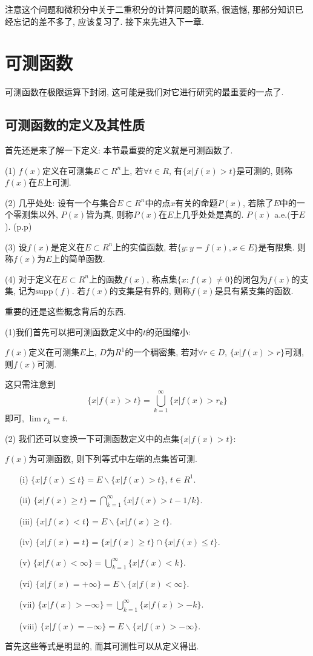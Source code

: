 \documentclass[12pt,a4paper,openany]{book}
\begin{document}
注意这个问题和微积分中关于二重积分的计算问题的联系, 很遗憾, 那部分知识已经忘记的差不多了, 应该复习了. 接下来先进入下一章.

\chapter{可测函数}
可测函数在极限运算下封闭, 这可能是我们对它进行研究的最重要的一点了.

\section{可测函数的定义及其性质}
首先还是来了解一下定义: 本节最重要的定义就是可测函数了.

(1) $f(x)$定义在可测集$E \subset R^n$上, 若$\forall t \in R$, 有$\{x | f(x) > t\}$是可测的, 则称$f(x)$在$E$上可测.

(2) 几乎处处: 设有一个与集合$E \subset R^n$中的点$x$有关的命题$P(x)$, 若除了$E$中的一个零测集以外, $P(x)$皆为真, 则称$P(x)$在$E$上几乎处处是真的. $P(x)$ a.e.(于$E$). (p.p)

(3) 设$f(x)$是定义在$E \subset R^n$上的实值函数, 若$\{y : y = f(x), x \in E\}$是有限集. 则称$f(x)$为$E$上的简单函数.

(4) 对于定义在$E \subset R^n$上的函数$f(x)$, 称点集$\{x:f(x) \neq 0\}$的闭包为$f(x)$的支集, 记为$\text{supp}(f)$. 若$f(x)$的支集是有界的, 则称$f(x)$是具有紧支集的函数.

重要的还是这些概念背后的东西.

(1)我们首先可以把可测函数定义中的$t$的范围缩小:

$f(x)$定义在可测集$E$上, $D$为$R^1$的一个稠密集, 若对$\forall r \in D$, $\{x | f(x) > r\}$可测, 则$f(x)$可测.

这只需注意到
\[
\{x | f(x) > t\} = \bigcup_{k=1}^{\infty}{\{ x | f(x) > r_k \}}
\]
即可, $\lim{r_k} = t$.

(2) 我们还可以变换一下可测函数定义中的点集$\{x | f(x) > t\}$:

$f(x)$为可测函数, 则下列等式中左端的点集皆可测.
\begin{enumerate}
\item[(i)] $\{x | f(x) \le t\} = E \backslash \{x | f(x) > t\}$, $t \in R^1$.
\item[(ii)] $\{x | f(x) \ge t\} = \bigcap_{k=1}^{\infty}{\{x | f(x) > t - 1/k\}}$.
\item[(iii)] $\{x | f(x) < t\} = E \backslash \{x | f(x) \ge t\}$.
\item[(iv)] $\{x | f(x) = t\} = \{x | f(x) \ge t\} \cap \{x | f(x) \le t\}$.
\item[(v)] $\{x | f(x) < \infty\} = \bigcup_{k=1}^{\infty}{\{x | f(x) < k\}}$.
\item[(vi)] $\{x | f(x) = +\infty\} = E \backslash \{x | f(x) < \infty\}$.
\item[(vii)] $\{x | f(x) > -\infty\} = \bigcup_{k=1}^{\infty}{\{x | f(x) > -k\}}$.
\item[(viii)] $\{x | f(x) = -\infty\} = E \backslash \{x | f(x) > -\infty\}$.
\end{enumerate}
首先这些等式是明显的, 而其可测性可以从定义得出.
\end{document}

